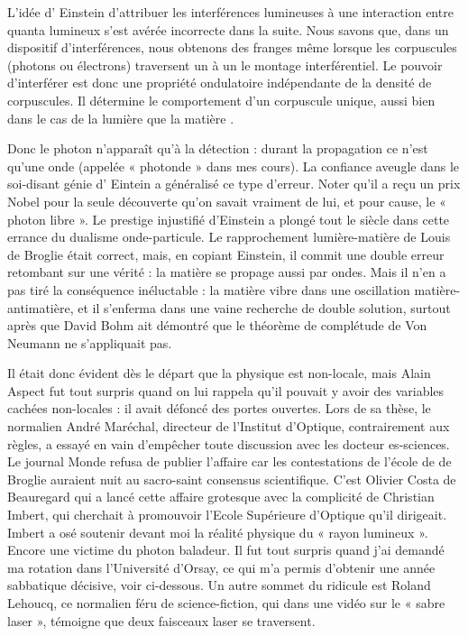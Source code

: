 \documentclass[a4paper,12pt]{article}
\begin{document}
L'idée d' Einstein d'attribuer les interférences lumineuses à une interaction entre quanta lumineux s'est avérée incorrecte dans la suite. Nous savons que, dans un dispositif d'interférences, nous obtenons des franges même lorsque les corpuscules (photons ou électrons) traversent un à un le montage interférentiel. Le pouvoir d'interférer est donc une propriété ondulatoire indépendante de la densité de corpuscules. Il détermine le comportement d'un corpuscule unique, aussi bien dans le cas de la lumière que la matière .

Donc le photon n'apparaît qu'à la détection : durant la propagation ce n'est qu'une onde (appelée « photonde » dans mes cours). La confiance aveugle dans le soi-disant génie d' Eintein a généralisé ce type d'erreur. Noter qu'il a reçu un prix Nobel pour la seule découverte qu'on savait vraiment de lui, et pour cause, le « photon libre ». Le prestige injustifié d'Einstein a plongé tout le siècle dans cette errance du dualisme onde-particule. Le rapprochement lumière-matière de Louis de Broglie était correct, mais, en copiant Einstein, il commit une double erreur retombant sur une vérité : la matière se propage aussi par ondes. Mais il n'en a pas tiré la conséquence inéluctable : la matière vibre dans une oscillation matière-antimatière, et il s'enferma dans une vaine recherche de double solution, surtout après que David Bohm ait démontré que le théorème de complétude de Von Neumann ne s'appliquait pas.

Il était donc évident dès le départ que la physique est non-locale, mais Alain Aspect fut tout surpris quand on lui rappela qu'il pouvait y avoir des variables cachées non-locales : il avait défoncé des portes ouvertes. Lors de sa thèse, le normalien André Maréchal, directeur de l'Institut d'Optique, contrairement aux règles, a essayé en vain d'empêcher toute discussion avec les docteur es-sciences. Le journal Monde refusa de publier l'affaire car les contestations de l'école de de Broglie auraient nuit au sacro-saint consensus scientifique. C'est Olivier Costa de Beauregard qui a lancé cette affaire grotesque avec la complicité de Christian Imbert, qui cherchait à promouvoir l'Ecole Supérieure d'Optique qu'il dirigeait. Imbert a osé soutenir devant moi la réalité physique du « rayon lumineux ». Encore une victime du photon baladeur. Il fut tout surpris quand j'ai demandé ma rotation dans l'Université d'Orsay, ce qui m'a permis d'obtenir une année sabbatique décisive, voir ci-dessous. Un autre sommet du ridicule est Roland Lehoucq, ce normalien féru de science-fiction, qui dans une vidéo sur le « sabre laser », témoigne que deux faisceaux laser se traversent.
\end{document}
